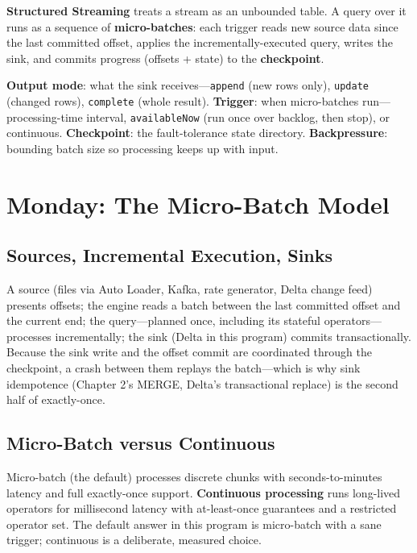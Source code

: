 \begin{definitionbox}
\textbf{Structured Streaming} treats a stream as an unbounded table. A query over it runs as a sequence of \textbf{micro-batches}: each trigger reads new source data since the last committed offset, applies the incrementally-executed query, writes the sink, and commits progress (offsets + state) to the \textbf{checkpoint}.
\end{definitionbox}

\begin{keyterms}
\textbf{Output mode}: what the sink receives---\texttt{append} (new rows only), \texttt{update} (changed rows), \texttt{complete} (whole result). \textbf{Trigger}: when micro-batches run---processing-time interval, \texttt{availableNow} (run once over backlog, then stop), or continuous. \textbf{Checkpoint}: the fault-tolerance state directory. \textbf{Backpressure}: bounding batch size so processing keeps up with input.
\end{keyterms}

\section{Monday: The Micro-Batch Model}
\subsection{Sources, Incremental Execution, Sinks}
A source (files via Auto Loader, Kafka, rate generator, Delta change feed) presents offsets; the engine reads a batch between the last committed offset and the current end; the query---planned once, including its stateful operators---processes incrementally; the sink (Delta in this program) commits transactionally. Because the sink write and the offset commit are coordinated through the checkpoint, a crash between them replays the batch---which is why sink idempotence (Chapter 2's MERGE, Delta's transactional replace) is the second half of exactly-once.

\subsection{Micro-Batch versus Continuous}
Micro-batch (the default) processes discrete chunks with seconds-to-minutes latency and full exactly-once support. \textbf{Continuous processing} runs long-lived operators for millisecond latency with at-least-once guarantees and a restricted operator set. The default answer in this program is micro-batch with a sane trigger; continuous is a deliberate, measured choice.

